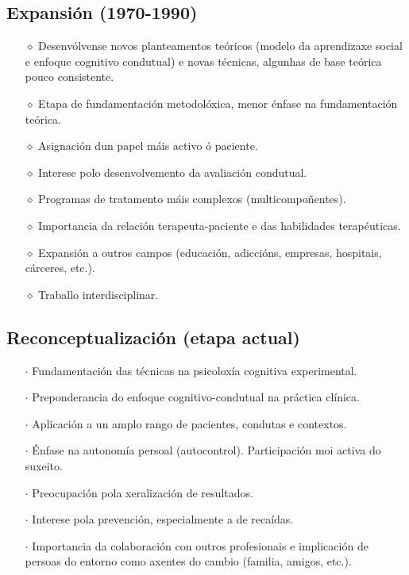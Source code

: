 \documentclass[a4paper,11pt]{article}
\begin{document}
\subsection{Expansión (1970-1990)}
\begin{itemize}
	\item[$\diamond$] Desenvólvense novos planteamentos teóricos (modelo da aprendizaxe social e 
	enfoque cognitivo condutual) e novas técnicas, algunhas de base teórica pouco consistente.
	\item[$\diamond$] Etapa de fundamentación metodolóxica, menor énfase na fundamentación teórica.
	\item[$\diamond$] Asignación dun papel máis activo ó paciente.
	\item[$\diamond$] Interese polo desenvolvemento da avaliación condutual.
	\item[$\diamond$] Programas de tratamento máis complexos (multicompoñentes).
	\item[$\diamond$] Importancia da relación terapeuta-paciente e das habilidades terapéuticas.
	\item[$\diamond$] Expansión a outros campos (educación, adiccións, empresas, hospitais, cárceres, 
	etc.). 
	\item[$\diamond$] Traballo interdisciplinar.
\end{itemize}

\subsection{Reconceptualización (etapa actual)}
\begin{itemize}
	\item[$\cdot$] Fundamentación das técnicas na psicoloxía cognitiva experimental.
	\item[$\cdot$] Preponderancia do enfoque cognitivo-condutual na práctica clínica.
	\item[$\cdot$] Aplicación a un amplo rango de pacientes, condutas e contextos.
	\item[$\cdot$] Énfase na autonomía persoal (autocontrol). Participación moi activa do suxeito.
	\item[$\cdot$] Preocupación pola xeralización de resultados.
	\item[$\cdot$] Interese pola prevención, especialmente a de recaídas.
	\item[$\cdot$] Importancia da colaboración con outros profesionais e implicación de persoas do 
	entorno como axentes do cambio (familia, amigos, etc.).  
\end{itemize}
\end{document}

